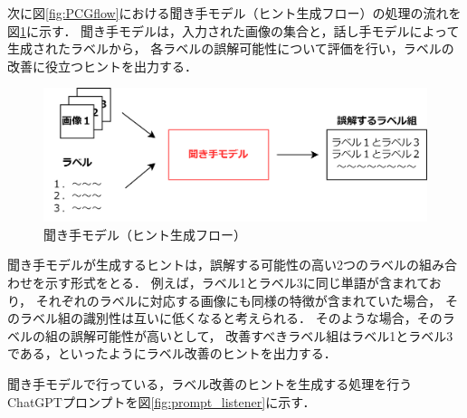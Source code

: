 \documentclass[a4paper,11pt]{jreport}
\begin{document}
次に図\ref{fig:PCGflow}における聞き手モデル（ヒント生成フロー）の処理の流れを図\ref{fig:PCGlistener}に示す．
聞き手モデルは，入力された画像の集合と，話し手モデルによって生成されたラベルから，
各ラベルの誤解可能性について評価を行い，ラベルの改善に役立つヒントを出力する．

\begin{figure}[H]
	\centering
	\includegraphics[width=0.8\linewidth]{figures/PCGlistener.png}
	\caption{聞き手モデル（ヒント生成フロー）}
	\label{fig:PCGlistener}
\end{figure}

聞き手モデルが生成するヒントは，誤解する可能性の高い2つのラベルの組み合わせを示す形式をとる．
例えば，ラベル1とラベル3に同じ単語が含まれており，
それぞれのラベルに対応する画像にも同様の特徴が含まれていた場合，
そのラベル組の識別性は互いに低くなると考えられる．
そのような場合，そのラベルの組の誤解可能性が高いとして，
改善すべきラベル組はラベル1とラベル3である，といったようにラベル改善のヒントを出力する．

聞き手モデルで行っている，ラベル改善のヒントを生成する処理を行うChatGPTプロンプトを図\ref{fig:prompt_listener}に示す．
\end{document}
